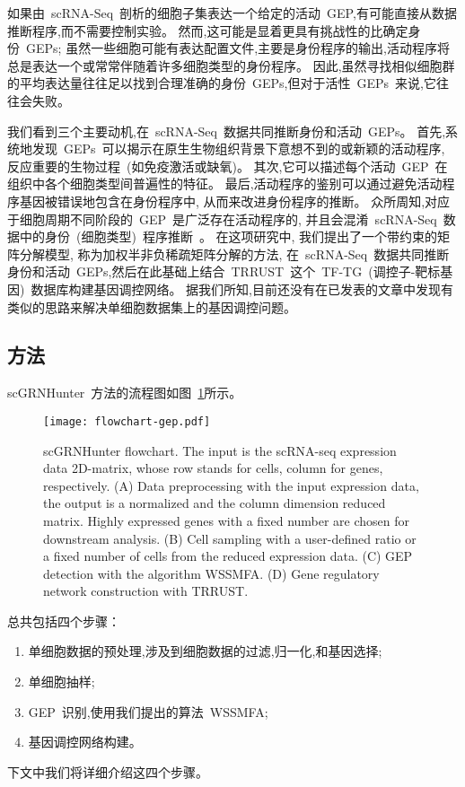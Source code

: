 如果由~scRNA-Seq~剖析的细胞子集表达一个给定的活动~GEP,有可能直接从数据推断程序,而不需要控制实验。
然而,这可能是显着更具有挑战性的比确定身份~GEPs;
虽然一些细胞可能有表达配置文件,主要是身份程序的输出,活动程序将总是表达一个或常常伴随着许多细胞类型的身份程序。
因此,虽然寻找相似细胞群的平均表达量往往足以找到合理准确的身份~GEPs,但对于活性~GEPs~来说,它往往会失败。

我们看到三个主要动机,在~scRNA-Seq~数据共同推断身份和活动~GEPs。
首先,系统地发现~GEPs~可以揭示在原生生物组织背景下意想不到的或新颖的活动程序,
反应重要的生物过程~(如免疫激活或缺氧)。
其次,它可以描述每个活动~GEP~在组织中各个细胞类型间普遍性的特征。
最后,活动程序的鉴别可以通过避免活动程序基因被错误地包含在身份程序中, 从而来改进身份程序的推断。
众所周知,对应于细胞周期不同阶段的~GEP~是广泛存在活动程序的,
并且会混淆~scRNA-Seq~数据中的身份~(细胞类型)~程序推断~\cite{scialdone2015computational,chen2017controlling}。
在这项研究中, 我们提出了一个带约束的矩阵分解模型, 称为加权半非负稀疏矩阵分解的方法,
在~scRNA-Seq~数据共同推断身份和活动~GEPs,然后在此基础上结合~TRRUST~这个~TF-TG~(调控子-靶标基因)~数据库构建基因调控网络。
据我们所知,目前还没有在已发表的文章中发现有类似的思路来解决单细胞数据集上的基因调控问题。

\subsection{方法}
scGRNHunter~方法的流程图如图~\ref{fig:gep-flowchart}所示。
\begin{figure}[!htbp]
    \centering
    \texttt{[image: flowchart-gep.pdf]}
    \caption{
        scGRNHunter flowchart. The input is the scRNA-seq expression data 2D-matrix, whose row stands for cells, column for genes, respectively.
        (A) Data preprocessing with the input expression data, the output is  a normalized and the column dimension reduced matrix. 
        Highly expressed genes with a fixed number are chosen for downstream analysis.
        (B) Cell sampling with a user-defined ratio or a fixed number of cells  from the reduced expression data. 
        (C) GEP detection with the algorithm WSSMFA. 
        (D) Gene regulatory network construction with TRRUST.
    }
    \label{fig:gep-flowchart}
\end{figure}
总共包括四个步骤：
\begin{enumerate}
    \item 单细胞数据的预处理,涉及到细胞数据的过滤,归一化,和基因选择;
    \item 单细胞抽样;
    \item GEP~识别,使用我们提出的算法~WSSMFA;
    \item 基因调控网络构建。
\end{enumerate}
下文中我们将详细介绍这四个步骤。

